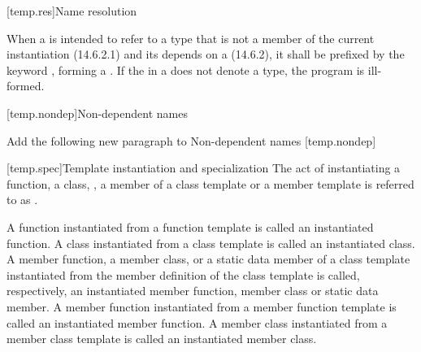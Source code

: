 \documentclass[american]{book}
\newcommand{\editorial}[1]{\colorbox{editbackground}{\begin{minipage}{\linewidth
}#1\end{minipage}}}
\begin{document}
\begin{paras}
\pnum
{}

\color{black}

[temp.res]{Name resolution}

\setcounter{Paras}{2}
\pnum
When a  is intended to refer to a type that is not a member of the current instantiation (14.6.2.1) and its 
depends on a  (14.6.2), it shall be prefixed by the keyword , forming a 
. If the  in a
 does not denote a type, the program is
ill-formed. 


\setcounter{subsection}{2}
[temp.nondep]{Non-dependent names}
\noindent\editorial{Add the following new paragraph to Non-dependent
  names [temp.nondep]}
\setcounter{Paras}{1}
\pnum
{}

[temp.spec]{Template instantiation and specialization}
\pnum
{}%
The act of instantiating a function, a class, , a member of a class template or
a member template is referred to as
.

\pnum
A function instantiated from a function template is called an instantiated
function.
A class instantiated from a class template is called an instantiated
class.
A member function, a member class, or a static data member of a class template
instantiated from the member definition of the class template is called,
respectively, an instantiated member function, member class or static data
member.
A member function instantiated from a member function template is called an
instantiated member function.
A member class instantiated from a member class template is called an
instantiated member class.


\end{paras}
\end{document}
